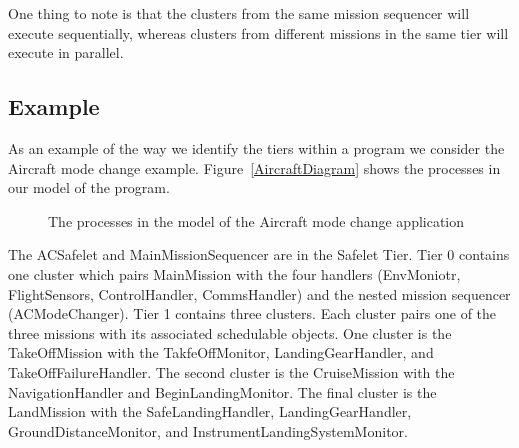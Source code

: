 One thing to note is that the clusters from the same mission sequencer will execute sequentially, whereas clusters from different missions in the same tier will execute in parallel. 

\subsection{Example}

As an example of the way we identify the tiers within a program we consider the Aircraft mode change example. Figure~\ref{AircraftDiagram} shows the processes in our model of the program. 

\begin{figure}

\caption{The processes in the model of the Aircraft mode change application }
\end{figure}

The ACSafelet and MainMissionSequencer are in the Safelet Tier. Tier 0 contains one cluster which pairs MainMission with the four handlers (EnvMoniotr, FlightSensors, ControlHandler, CommsHandler) and the nested mission sequencer (ACModeChanger). Tier 1 contains three clusters. Each cluster pairs one of the three missions with its associated schedulable objects. One cluster is the TakeOffMission with the TakfeOffMonitor, LandingGearHandler, and TakeOffFailureHandler. The second cluster is the CruiseMission with the NavigationHandler and BeginLandingMonitor. The final cluster is the LandMission with the SafeLandingHandler, LandingGearHandler, GroundDistanceMonitor, and InstrumentLandingSystemMonitor. 
